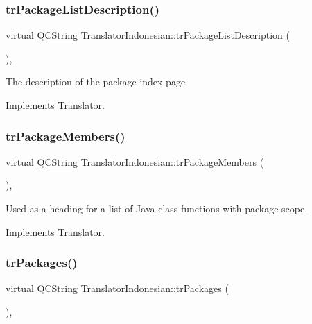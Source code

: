 \subsubsection{\texorpdfstring{trPackageListDescription()}{trPackageListDescription()}}
{\footnotesize\ttfamily virtual \mbox{\hyperlink{class_q_c_string}{Q\+C\+String}} Translator\+Indonesian\+::tr\+Package\+List\+Description (\begin{DoxyParamCaption}{ }\end{DoxyParamCaption})\hspace{0.3cm}{\ttfamily [inline]}, {\ttfamily [virtual]}}

The description of the package index page 

Implements \mbox{\hyperlink{class_translator}{Translator}}.

\mbox{\label{class_translator_indonesian_af601679d277dbc3ad6c83a7db1eb4a2f}} 
\subsubsection{\texorpdfstring{trPackageMembers()}{trPackageMembers()}}
{\footnotesize\ttfamily virtual \mbox{\hyperlink{class_q_c_string}{Q\+C\+String}} Translator\+Indonesian\+::tr\+Package\+Members (\begin{DoxyParamCaption}{ }\end{DoxyParamCaption})\hspace{0.3cm}{\ttfamily [inline]}, {\ttfamily [virtual]}}

Used as a heading for a list of Java class functions with package scope. 

Implements \mbox{\hyperlink{class_translator}{Translator}}.

\mbox{\label{class_translator_indonesian_a953bd5c1fbc15c74801cbfa19edc73ed}} 
\subsubsection{\texorpdfstring{trPackages()}{trPackages()}}
{\footnotesize\ttfamily virtual \mbox{\hyperlink{class_q_c_string}{Q\+C\+String}} Translator\+Indonesian\+::tr\+Packages (\begin{DoxyParamCaption}{ }\end{DoxyParamCaption})\hspace{0.3cm}{\ttfamily [inline]}, {\ttfamily [virtual]}}

